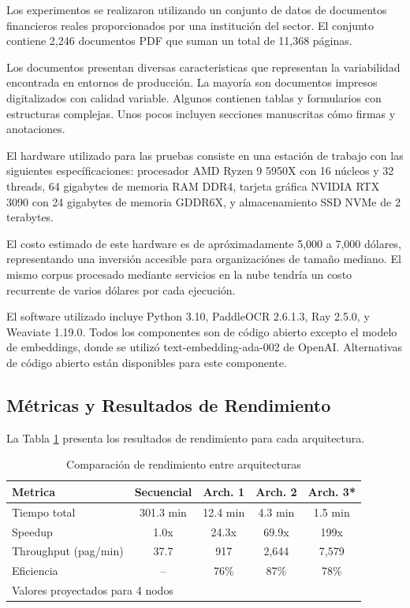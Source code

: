 \documentclass[12pt,a4paper,twoside]{book}
\begin{document}
Los experimentos se realizaron utilizando un conjunto de datos de documentos financieros reales proporcionados por una institución del sector. El conjunto contiene 2,246 documentos PDF que suman un total de 11,368 páginas.

Los documentos presentan diversas caracteristicas que representan la variabilidad encontrada en entornos de producción. La mayoría son documentos impresos digitalizados con calidad variable. Algunos contienen tablas y formularios con estructuras complejas. Unos pocos incluyen secciones manuscritas cómo firmas y anotaciones.

El hardware utilizado para las pruebas consiste en una estación de trabajo con las siguientes específicaciones: procesador AMD Ryzen 9 5950X con 16 núcleos y 32 threads, 64 gigabytes de memoria RAM DDR4, tarjeta gráfica NVIDIA RTX 3090 con 24 gigabytes de memoria GDDR6X, y almacenamiento SSD NVMe de 2 terabytes.

El costo estimado de este hardware es de apróximadamente 5,000 a 7,000 dólares, representando una inversión accesible para organizaciónes de tamaño mediano. El mismo corpus procesado mediante servicios en la nube tendría un costo recurrente de varios dólares por cada ejecución.

El software utilizado incluye Python 3.10, PaddleOCR 2.6.1.3, Ray 2.5.0, y Weaviate 1.19.0. Todos los componentes son de código abierto excepto el modelo de embeddings, donde se utilizó text-embedding-ada-002 de OpenAI. Alternativas de código abierto están disponibles para este componente.

\subsection{Métricas y Resultados de Rendimiento}

La Tabla \ref{tab:comparación_arquitecturas} presenta los resultados de rendimiento para cada arquitectura.

\begin{table}[h]
\centering
\caption{Comparación de rendimiento entre arquitecturas}
\label{tab:comparación_arquitecturas}
\begin{tabular}{lcccc}
\toprule
\textbf{Metrica} & \textbf{Secuencial} & \textbf{Arch. 1} & \textbf{Arch. 2} & \textbf{Arch. 3*} \\
\midrule
Tiempo total & 301.3 min & 12.4 min & 4.3 min & 1.5 min \\
Speedup & 1.0x & 24.3x & 69.9x & 199x \\
Throughput (pag/min) & 37.7 & 917 & 2,644 & 7,579 \\
Eficiencia & -- & 76\% & 87\% & 78\% \\
\bottomrule
\multicolumn{5}{l}{\small *Valores proyectados para 4 nodos}
\end{tabular}
\end{table}
\end{document}
